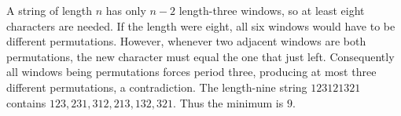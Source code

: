 A string of length $n$ has only $n-2$ length-three windows, so at least eight characters are needed. If the length were eight, all six windows would have to be different permutations. However, whenever two adjacent windows are both permutations, the new character must equal the one that just left. Consequently all windows being permutations forces period three, producing at most three different permutations, a contradiction. The length-nine string $123121321$ contains $123,231,312,213,132,321$. Thus the minimum is $\boxed9$.
